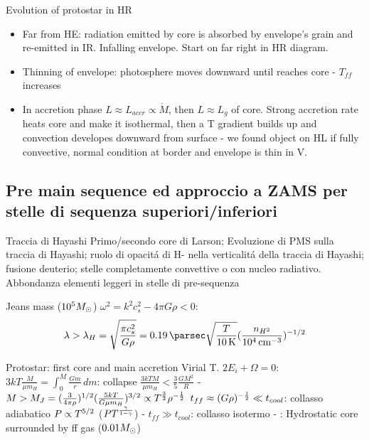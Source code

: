 \begin{frame}{Evolution of protostar in HR}
\begin{itemize}
\item Far from HE: radiation emitted by core is absorbed by envelope's grain and re-emitted in IR. Infalling envelope. Start on far right in HR diagram.
\item Thinning of envelope: photosphere moves downward until reaches core - $T_{ff}$ increases
\item In accretion phase $L\approx L_{accr}\propto\dot{M}$, then $L\approx L_g$ of core. Strong accretion rate heats core and make it isothermal, then a T gradient builds up and convection developes downward from surface - we found object on HL if fully convective, normal condition at border and envelope is thin in V.
\end{itemize}
\end{frame}

\subsection{Pre main sequence ed approccio a ZAMS per stelle di sequenza superiori/inferiori}

\begin{frame}{Traccia di Hayashi}
Primo/secondo core di Larson; Evoluzione di PMS sulla traccia di Hayashi; ruolo di opacit\'a di H- nella verticalit\'a della traccia di Hayashi; fusione deuterio; stelle completamente convettive o con nucleo radiativo. Abbondanza elementi leggeri in stelle di pre-sequenza
\end{frame}


\begin{frame}{Jeans mass ($\num{e5}M_{\odot}$)}
 $\omega^2=k^2c_s^2-4\pi G\rho<0$:
\[\lambda>\lambda_H=\sqrt{\frac{\pi c_s^2}{G\rho}}=\SI{0.19}{\parsec}\sqrt{\frac{T}{\SI{10}{\kelvin}}}(\frac{n_{H^2}}{\SI{e4}{\per\cubic\cm}})\expy{-1/2}\]
\end{frame}

\begin{frame}{Protostar: first core and main accretion}
Virial T. $2E_i+\Omega=0$: $3kT\frac{M}{\mu m_H}=\int_0^M\frac{Gm}{r}\,dm$: collapse $\frac{3kTM}{\mu m_H}<\frac{3}{5}\frac{GM^2}{R}$ - $M>M_J=(\frac{3}{4\pi\rho})^{1/2}(\frac{5kT}{G\mu m_H})^{3/2}\propto T^{\frac{3}{2}}\rho^{-\frac{1}{2}}$
$t_{ff}\approx(G\rho)^{-\frac{1}{2}}\ll t_{cool}$: collasso adiabatico $P\propto T^{5/2}$ ($PT^{\frac{\gamma}{1-\gamma}}$) - $t_{ff}\gg t_{cool}$: collasso isotermo - : Hydrostatic core surrounded by ff gas ($0.01M_{\odot}$) 
\end{frame}

